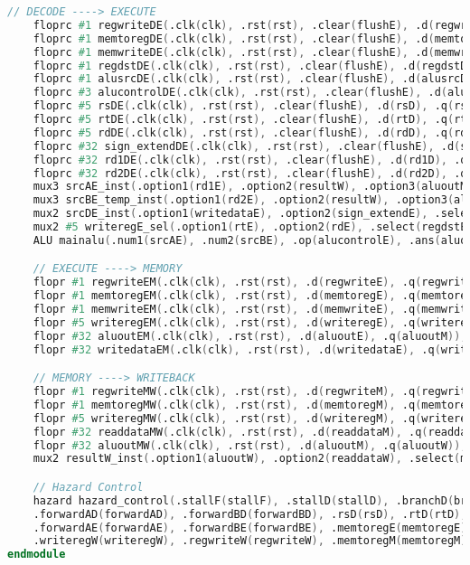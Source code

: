 \begin{lstlisting}[language=Verilog]
    // DECODE ----> EXECUTE
    floprc #1 regwriteDE(.clk(clk), .rst(rst), .clear(flushE), .d(regwriteD), .q(regwriteE));
    floprc #1 memtoregDE(.clk(clk), .rst(rst), .clear(flushE), .d(memtoregD), .q(memtoregE));
    floprc #1 memwriteDE(.clk(clk), .rst(rst), .clear(flushE), .d(memwriteD), .q(memwriteE));
    floprc #1 regdstDE(.clk(clk), .rst(rst), .clear(flushE), .d(regdstD), .q(regdstE));
    floprc #1 alusrcDE(.clk(clk), .rst(rst), .clear(flushE), .d(alusrcD), .q(alusrcE));
    floprc #3 alucontrolDE(.clk(clk), .rst(rst), .clear(flushE), .d(alucontrolD), .q(alucontrolE));
    floprc #5 rsDE(.clk(clk), .rst(rst), .clear(flushE), .d(rsD), .q(rsE));
    floprc #5 rtDE(.clk(clk), .rst(rst), .clear(flushE), .d(rtD), .q(rtE));
    floprc #5 rdDE(.clk(clk), .rst(rst), .clear(flushE), .d(rdD), .q(rdE));
    floprc #32 sign_extendDE(.clk(clk), .rst(rst), .clear(flushE), .d(sign_extendD), .q(sign_extendE));
    floprc #32 rd1DE(.clk(clk), .rst(rst), .clear(flushE), .d(rd1D), .q(rd1E));
    floprc #32 rd2DE(.clk(clk), .rst(rst), .clear(flushE), .d(rd2D), .q(rd2E));
    mux3 srcAE_inst(.option1(rd1E), .option2(resultW), .option3(aluoutM), .select(forwardAE), .data(srcAE));
    mux3 srcBE_temp_inst(.option1(rd2E), .option2(resultW), .option3(aluoutM), .select(forwardBE), .data(writedataE));
    mux2 srcDE_inst(.option1(writedataE), .option2(sign_extendE), .select(alusrcE), .data(srcBE)); 
    mux2 #5 writeregE_sel(.option1(rtE), .option2(rdE), .select(regdstE), .data(writeregE));
    ALU mainalu(.num1(srcAE), .num2(srcBE), .op(alucontrolE), .ans(aluoutE));

    // EXECUTE ----> MEMORY
    flopr #1 regwriteEM(.clk(clk), .rst(rst), .d(regwriteE), .q(regwriteM));
    flopr #1 memtoregEM(.clk(clk), .rst(rst), .d(memtoregE), .q(memtoregM));
    flopr #1 memwriteEM(.clk(clk), .rst(rst), .d(memwriteE), .q(memwriteM));
    flopr #5 writeregEM(.clk(clk), .rst(rst), .d(writeregE), .q(writeregM));
    flopr #32 aluoutEM(.clk(clk), .rst(rst), .d(aluoutE), .q(aluoutM));
    flopr #32 writedataEM(.clk(clk), .rst(rst), .d(writedataE), .q(writedataM));

    // MEMORY ----> WRITEBACK
    flopr #1 regwriteMW(.clk(clk), .rst(rst), .d(regwriteM), .q(regwriteW));
    flopr #1 memtoregMW(.clk(clk), .rst(rst), .d(memtoregM), .q(memtoregW));
    flopr #5 writeregMW(.clk(clk), .rst(rst), .d(writeregM), .q(writeregW));
    flopr #32 readdataMW(.clk(clk), .rst(rst), .d(readdataM), .q(readdataW));
    flopr #32 aluoutMW(.clk(clk), .rst(rst), .d(aluoutM), .q(aluoutW));
    mux2 resultW_inst(.option1(aluoutW), .option2(readdataW), .select(memtoregW), .data(resultW));

    // Hazard Control
    hazard hazard_control(.stallF(stallF), .stallD(stallD), .branchD(branchD),
    .forwardAD(forwardAD), .forwardBD(forwardBD), .rsD(rsD), .rtD(rtD), .flushE(flushE), .rsE(rsE), .rtE(rtE), 
    .forwardAE(forwardAE), .forwardBE(forwardBE), .memtoregE(memtoregE), .regwriteE(regwriteE), .writeregE(writeregE), 
    .writeregW(writeregW), .regwriteW(regwriteW), .memtoregM(memtoregM), .regwriteM(regwriteM), .writeregM(writeregM));
endmodule
\end{lstlisting}

